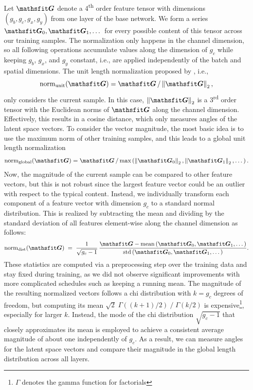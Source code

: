 \documentclass{article}
\begin{document}
Let $\tG$ denote a 4\textsuperscript{th} order feature tensor with dimensions $(g_b, g_c, g_x, g_y)$ from one layer of the base network. We form a series $\tG_0, \tG_1, \dotsc$ for every possible content of this tensor across our training samples. The normalization only happens in the channel dimension, so all following operations accumulate values along the dimension of $g_c$ while keeping $g_b$, $g_x$, and $g_y$ constant, i.e., are applied independently of the batch and spatial dimensions.
The unit length normalization proposed by \citeauthor{zhang2018}, i.e.,
\begin{equation*}
    \text{norm}_{\text{unit}}(\tG) = \tG \, / \left\| \tG \right\|_2,
\end{equation*}
only considers the current sample. In this case, $\left\| \tG \right\|_2$ is a 3\textsuperscript{rd} order tensor with the Euclidean norms of $\tG$ along the channel dimension. Effectively, this results in a cosine distance, which only measures angles of the latent space vectors. To consider the vector magnitude, the most basic idea is to use the maximum norm of other training samples, and this leads to a global unit length normalization
\begin{equation*}
    \text{norm}_{\text{global}}(\tG) = \tG \, / \, \text{max} \left(  \left\| \tG_0 \right\|_2,  \left\| \tG_1 \right\|_2, \dotsc  \right).
\end{equation*}
Now, the magnitude of the current sample can be compared to other feature vectors, but this is not robust since the largest feature vector could be an outlier with respect to the typical content.
Instead, we individually transform each component of a feature vector with dimension $g_c$ to a standard normal distribution. This is realized by subtracting the mean and dividing by the standard deviation of all features element-wise along the channel dimension as follows:
\begin{equation*}
    \text{norm}_{\text{dist}}(\tG) \;=\; \frac{1}{\sqrt{g_c - 1}} \, \frac{\tG - \text{mean} \left(  \tG_0, \tG_1, \dotsc  \right)}
    {\text{std} \left(  \tG_0, \tG_1, \dotsc  \right)}.
\end{equation*}
These statistics are computed via a preprocessing step over the training data and stay fixed during training, as we did not observe significant improvements with more complicated schedules such as keeping a running mean.
The magnitude of the resulting normalized vectors follows a chi distribution with $k=g_c$ degrees of freedom, but computing its mean $\sqrt{2} \; \Gamma((k+1)/2) \;/\; \Gamma(k/2)$ is expensive\footnote{$\Gamma$ denotes the gamma function for factorials}, especially for larger $k$. Instead, the mode of the chi distribution $\sqrt{g_c - 1}$ that closely approximates its mean is employed to achieve a consistent average magnitude of about one independently of $g_c$. As a result, we can measure angles for the latent space vectors and compare their magnitude in the global length distribution across all layers.
\end{document}

